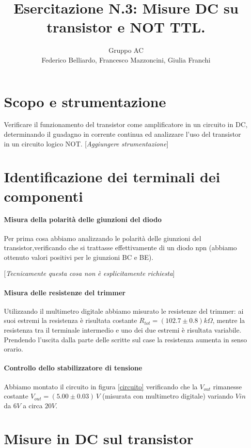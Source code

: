\documentclass[10pt,a4paper]{article}
\author{Gruppo AC \\ Federico Belliardo, Francesco Mazzoncini, Giulia Franchi}
\title{Esercitazione N.3: Misure DC su transistor e NOT TTL.}
\newcommand{\rem}[1]{[\emph{#1}]}
\begin{document}
\maketitle
\section{Scopo e strumentazione}
Verificare il funzionamento del transistor come amplificatore in un circuito in DC, determinando il guadagno in corrente continua ed analizzare l'uso del transistor in un circuito logico NOT.
\rem{Aggiungere strumentazione}

\section{Identificazione dei terminali dei componenti}

\paragraph{Misura della polarità delle giunzioni del diodo}
Per prima cosa abbiamo analizzando le polarità delle giunzioni del transistor,verificando che si trattasse effettivamente  di un diodo npn (abbiamo ottenuto valori positivi per le giunzioni BC e BE).

\rem{Tecnicamente questa cosa non è esplicitamente richiesta}
\paragraph{Misura delle resistenze del trimmer}

Utilizzando il multimetro digitale abbiamo misurato le resistenze del trimmer: ai suoi estremi la resistenza è risultata costante $R_{tot}= (102.7 \pm 0.8) k\Omega$, mentre la resistenza tra il terminale intermedio e uno dei due estremi è risultata variabile. Prendendo l'uscita dalla parte delle scritte sul case la resistenza aumenta in senso orario.

\paragraph{Controllo dello stabilizzatore di tensione}
Abbiamo montato il circuito in  figura \ref{circuito} verificando che  la $V_{out}$ rimanesse costante $V_{out} = (5.00 \pm 0.03) \, V$ (misurata con multimetro digitale) variando $V{in}$ da $6V$ a circa $20V$. 

\section{Misure in DC sul transistor}
\end{document}
